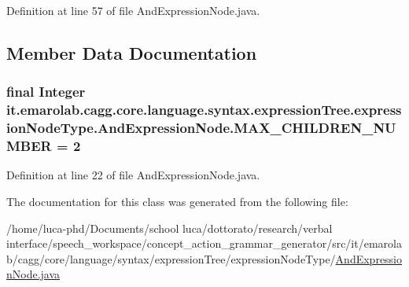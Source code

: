 Definition at line 57 of file And\-Expression\-Node.\-java.



\subsection{Member Data Documentation}
\hypertarget{classit_1_1emarolab_1_1cagg_1_1core_1_1language_1_1syntax_1_1expressionTree_1_1expressionNodeType_1_1AndExpressionNode_a24ad03cf5c74c53d915a5b186b24ce8c}{
\subsubsection[{M\-A\-X\-\_\-\-C\-H\-I\-L\-D\-R\-E\-N\-\_\-\-N\-U\-M\-B\-E\-R}]{\setlength{\rightskip}{0pt plus 5cm}final Integer it.\-emarolab.\-cagg.\-core.\-language.\-syntax.\-expression\-Tree.\-expression\-Node\-Type.\-And\-Expression\-Node.\-M\-A\-X\-\_\-\-C\-H\-I\-L\-D\-R\-E\-N\-\_\-\-N\-U\-M\-B\-E\-R = 2\hspace{0.3cm}{\ttfamily [static]}}}\label{classit_1_1emarolab_1_1cagg_1_1core_1_1language_1_1syntax_1_1expressionTree_1_1expressionNodeType_1_1AndExpressionNode_a24ad03cf5c74c53d915a5b186b24ce8c}


Definition at line 22 of file And\-Expression\-Node.\-java.



The documentation for this class was generated from the following file\-:\begin{DoxyCompactItemize}
\item 
/home/luca-\/phd/\-Documents/school luca/dottorato/research/verbal interface/speech\-\_\-workspace/concept\-\_\-action\-\_\-grammar\-\_\-generator/src/it/emarolab/cagg/core/language/syntax/expression\-Tree/expression\-Node\-Type/\hyperlink{AndExpressionNode_8java}{And\-Expression\-Node.\-java}\end{DoxyCompactItemize}
